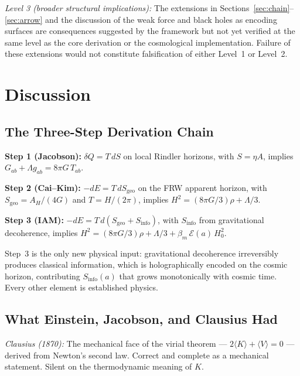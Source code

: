 \documentclass[12pt,a4paper]{article}
\begin{document}
\textit{Level 3 (broader structural implications):} The
extensions in Sections~\ref{sec:chain}--\ref{sec:arrow} and the
discussion of the weak force and black holes as encoding surfaces
are consequences suggested by the framework but not yet verified
at the same level as the core derivation or the cosmological
implementation. Failure of these extensions would not constitute
falsification of either Level~1 or Level~2.

\section{Discussion}
\label{sec:discussion}

\subsection{The Three-Step Derivation Chain}

\textbf{Step 1 (Jacobson):} $\delta Q = T\,dS$ on local Rindler
horizons, with $S = \eta A$, implies $G_{ab} + \Lambda g_{ab}
= 8\pi G\,T_{ab}$.

\textbf{Step 2 (Cai--Kim):} $-dE = T\,dS_\mathrm{geo}$ on the FRW
apparent horizon, with $S_\mathrm{geo} = A_H/(4G)$ and
$T = H/(2\pi)$, implies $H^2 = (8\pi G/3)\rho + \Lambda/3$.

\textbf{Step 3 (IAM):} $-dE = T\,d(S_\mathrm{geo} + S_\mathrm{info})$,
with $S_\mathrm{info}$ from gravitational decoherence, implies
$H^2 = (8\pi G/3)\rho + \Lambda/3 + \beta_m\,\mathcal{E}(a)\,H_0^2$.

Step~3 is the only new physical input: gravitational decoherence
irreversibly produces classical information, which is holographically
encoded on the cosmic horizon, contributing $S_\mathrm{info}(a)$ that
grows monotonically with cosmic time. Every other element is
established physics.

\subsection{What Einstein, Jacobson, and Clausius Had}

\textit{Clausius (1870):} The mechanical face of the virial theorem
--- $2\langle K \rangle + \langle V \rangle = 0$ --- derived from
Newton's second law. Correct and complete as a mechanical statement.
Silent on the thermodynamic meaning of $K$.
\end{document}
